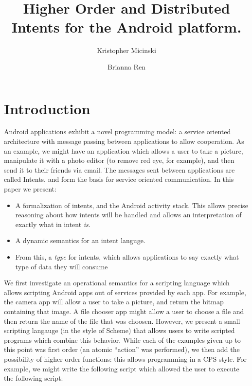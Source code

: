 \documentclass{acm_proc_article-sp}
\begin{document}
\title{Higher Order and Distributed Intents for the Android platform.}

\author{
Kristopher Micinski\\
\and
Brianna Ren\\
}

\maketitle

\begin{abstract}
\end{abstract}

\section{Introduction}
Android applications exhibit a novel programming model: a service
oriented architecture with message passing between applications to
allow cooperation.  As an example, we might have an application which
allows a user to take a picture, manipulate it with a photo editor (to
remove red eye, for example), and then send it to their friends via
email.  The messages sent between applications are called Intents, and
form the basis for service oriented communication.  In this paper we
present:

\begin{itemize}
\item A formalization of intents, and the Android activity stack.
  This allows precise reasoning about how intents will be handled and
  allows an interpretation of exactly what in intent \emph{is}.
\item A dynamic semantics for an intent languge.
\item From this, a \emph{type} for intents, which allows applications
  to say exactly what type of data they will consume 
\end{itemize}

We first investigate an operational semantics for a scripting language
which allows scripting Android apps out of services provided by each
app.  For example, the camera app will allow a user to take a picture,
and return the bitmap containing that image.  A file chooser app might
allow a user to choose a file and then return the name of the file
that was choosen.  However, we present a small scripting langauge (in
the style of Scheme) that allows users to write scripted programs
which combine this behavior.  While each of the examples given up to
this point was first order (an atomic ``action'' was performed), we
then add the possibility of higher order functions: this allows
programming in a CPS style.  For example, we might write the following
script which allowed the user to execute the following script:
\end{document}
